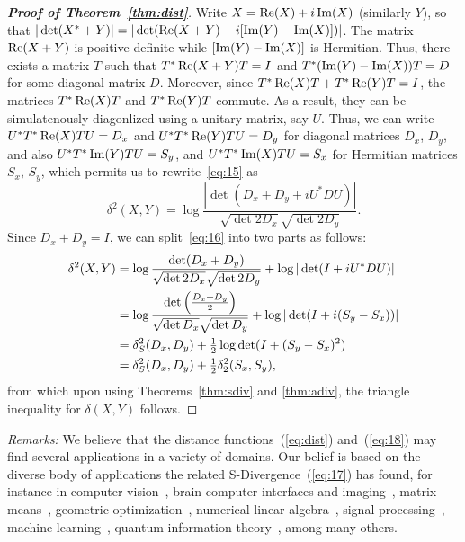\documentclass[11pt]{article}
\begin{document}
\begin{proof}[\bfseries Proof of Theorem~\ref{thm:dist}]
  Write $X=\operatorname{Re}(X)+i\operatorname{Im}(X)$ (similarly $Y$), so that $|\det(X^*+Y)|=|\det(\operatorname{Re}(X+Y)+i[\operatorname{Im}(Y)-\operatorname{Im}(X)])|$.
  The matrix $\operatorname{Re}(X+Y)$ is positive definite while $[\operatorname{Im}(Y)-\operatorname{Im}(X)]$ is Hermitian. Thus, there exists a matrix $T$ such that $T^*\operatorname{Re}(X+Y)T=I$ and $T^*(\operatorname{Im}(Y)-\operatorname{Im}(X))T=D$ for some diagonal matrix $D$. Moreover, since $T^*\operatorname{Re}(X)T+T^*\operatorname{Re}(Y)T=I$, the matrices $T^*\operatorname{Re}(X)T$ and $T^*\operatorname{Re}(Y)T$ commute. As a result, they can be simulatenously diagonlized using a unitary matrix, say $U$. Thus, we can write $U^*T^*\operatorname{Re}(X)TU=D_x$ and $U^*T^*\operatorname{Re}(Y)TU=D_y$ for diagonal matrices $D_x$, $D_y$, and also $U^*T^*\operatorname{Im}(Y)TU=S_y$, and $U^*T^*\operatorname{Im}(X)TU=S_x$ for Hermitian matrices $S_x$, $S_y$, which permits us to rewrite~\eqref{eq:15} as
  \begin{equation}
    \label{eq:16}
    \delta^2(X,Y) = \log\frac{|\det(D_x+D_y+iU^*DU)|}{\sqrt{\det{2D_x}}\sqrt{\det{2D_y}}}.
  \end{equation}
  Since $D_x+D_y=I$, we can split~\eqref{eq:16} into two parts as follows:
  \begin{align*}
    \delta^2(X,Y) &= \log\frac{\det(D_x+D_y)}{\sqrt{\det{2D_x}}\sqrt{\det{2D_y}}} + \log|\det(I+iU^*DU)|\\
    &= \log\frac{\det\left(\tfrac{D_x+D_y}{2}\right)}{\sqrt{\det D_x}\sqrt{\det D_y}} + \log|\det(I+i(S_y-S_x))|\\
    &= \delta_S^2(D_x,D_y) + \tfrac{1}{2}\log\det(I+(S_y-S_x)^2)\\
    &= \delta_S^2(D_x,D_y) + \tfrac{1}{2}\delta_2^2(S_x,S_y),
  \end{align*}
  from which upon using Theorems~\ref{thm:sdiv} and \ref{thm:adiv}, the triangle inequality for $\delta(X,Y)$ follows.
\end{proof}

\emph{Remarks:} We believe that the distance functions~(\ref{eq:dist}) and~(\ref{eq:18}) may find several applications in a variety of domains. Our belief is based on the diverse body of applications the related S-Divergence~(\ref{eq:17}) has found, for instance in computer vision~\citep{cherian2012}, brain-computer interfaces and imaging~\citep{yger2016}, matrix means~\citep{sra2016,chebbi2012}, geometric optimization~\citep{sra2015,boumal2020}, numerical linear algebra~\citep{sra2016b}, signal processing~\citep{bouchard2018}, machine learning~\citep{zern2018,tiomoko2019}, quantum information theory~\citep{virosztek2021}, among many others.
\end{document}

